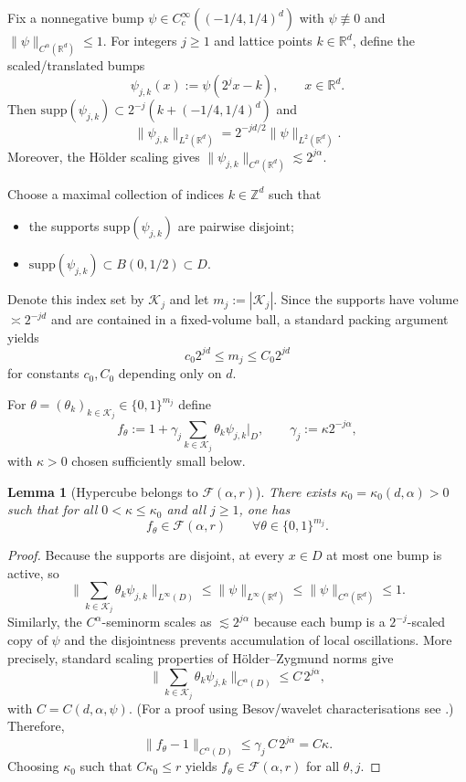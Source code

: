 \documentclass[11pt]{article}
\newtheorem{lemma}{Lemma}
\theoremstyle{definition}
\theoremstyle{remark}
\newcommand{\R}{\mathbb{R}}
\newcommand{\1}{\mathbf{1}}
\begin{document}
Fix a nonnegative bump $\psi\in C_c^\infty((-1/4,1/4)^d)$ with $\psi\not\equiv0$ and $\|\psi\|_{C^\alpha(\R^d)}\le 1$.
For integers $j\ge1$ and lattice points $k\in\R^d$, define the scaled/translated bumps
\[
\psi_{j,k}(x):=\psi(2^j x-k),\qquad x\in\R^d.
\]
Then $\mathrm{supp}(\psi_{j,k})\subset 2^{-j}(k+(-1/4,1/4)^d)$ and
\begin{equation}\label{eq:scaling-L2}
\|\psi_{j,k}\|_{L^2(\R^d)} = 2^{-jd/2}\|\psi\|_{L^2(\R^d)}.
\end{equation}
Moreover, the H\"older scaling gives $\|\psi_{j,k}\|_{C^\alpha(\R^d)}\lesssim 2^{j\alpha}$.

Choose a maximal collection of indices $k\in\mathbb Z^d$ such that
\begin{itemize}
\item the supports $\mathrm{supp}(\psi_{j,k})$ are pairwise disjoint;
\item $\mathrm{supp}(\psi_{j,k})\subset B(0,1/2)\subset D$.
\end{itemize}
Denote this index set by $\mathcal K_j$ and let $m_j:=|\mathcal K_j|$. Since the supports have volume $\asymp 2^{-jd}$ and are contained in a fixed-volume ball, a standard packing argument yields
\begin{equation}\label{eq:mj}
c_0 2^{jd}\le m_j \le C_0 2^{jd}
\end{equation}
for constants $c_0,C_0$ depending only on $d$.

For $\theta=(\theta_k)_{k\in\mathcal K_j}\in\{0,1\}^{m_j}$ define
\begin{equation}\label{eq:f-theta}
f_\theta := 1 + \gamma_j \sum_{k\in\mathcal K_j} \theta_k \psi_{j,k}\Big|_{D},
\qquad \gamma_j := \kappa 2^{-j\alpha},
\end{equation}
with $\kappa>0$ chosen sufficiently small below.

\begin{lemma}[Hypercube belongs to $\mathcal F(\alpha,r)$]\label{lem:hypercube-in-class}
There exists $\kappa_0=\kappa_0(d,\alpha)>0$ such that for all $0<\kappa\le \kappa_0$ and all $j\ge1$, one has
\[
f_\theta\in \mathcal F(\alpha,r)\qquad \forall \theta\in\{0,1\}^{m_j}.
\]
\end{lemma}

\begin{proof}
Because the supports are disjoint, at every $x\in D$ at most one bump is active, so
\[
\Big\|\sum_{k\in\mathcal K_j} \theta_k\psi_{j,k}\Big\|_{L^\infty(D)}
\le \|\psi\|_{L^\infty(\R^d)}\le \|\psi\|_{C^\alpha(\R^d)}\le 1.
\]
Similarly, the $C^\alpha$-seminorm scales as $\lesssim 2^{j\alpha}$ because each bump is a $2^{-j}$-scaled copy of $\psi$ and the disjointness prevents accumulation of local oscillations. More precisely, standard scaling properties of H\"older--Zygmund norms give
\[
\Big\|\sum_{k\in\mathcal K_j} \theta_k\psi_{j,k}\Big\|_{C^\alpha(D)} \le C\,2^{j\alpha},
\]
with $C=C(d,\alpha,\psi)$. (For a proof using Besov/wavelet characterisations see \cite[Ch.~2]{Triebel2006}.)
Therefore,
\[
\|f_\theta-1\|_{C^\alpha(D)} \le \gamma_j\, C\,2^{j\alpha}= C\kappa.
\]
Choosing $\kappa_0$ such that $C\kappa_0\le r$ yields $f_\theta\in\mathcal F(\alpha,r)$ for all $\theta,j$.
\end{proof}
\end{document}
